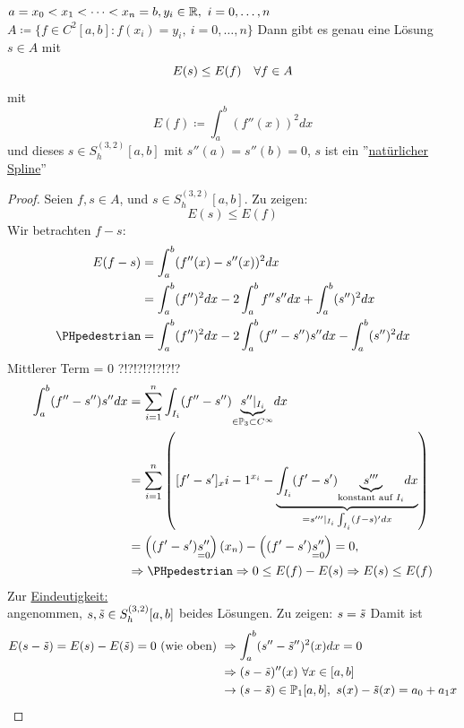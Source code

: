 \begin{theorem}
    \(a=x_0<x_1<\dots<x_n=b, y_i \in \mathbb{R} , \ i=0,\dots,n\)\\
    \(A\coloneqq \{ f\in C^2[a,b]\colon f(x_i)=y_i, \ i=0,\dots,n\}\)
    Dann gibt es genau eine Lösung $s\in A$ mit \[
        E(s) \leq E(f)\hspace{1em} \forall f\in A
    \] mit \[
        E(f) \coloneqq \int_a^b (f''(x))^2 dx
    \]
    und dieses \(s\in S^{(3,2)}_h[a,b]\) mit $s''(a)=s''(b)=0$, $s$ ist ein ''\underline{natürlicher Spline}''
    
\end{theorem}
\begin{proof}
    Seien $f,s\in A$, und $s\in S^{(3,2)}_h[a,b]$. Zu zeigen:\[
        E(s) \leq E(f)
    \]
    Wir betrachten $f-s$: \begin{align*}
        E(f-s) &= \int_a^b (f''(x) - s''(x))^2 dx\\
               &= \int_a^b (f'')^2 dx  - 2 \int_a^b f''s'' dx + \int_a^b (s'')^2 dx\\
              \text{\PHpedestrian} &= \int_a^b (f'')^2 dx - 2 \int_a^b(f'' - s'')s'' dx - \int_a^b (s'')^2 dx
    \end{align*}
    Mittlerer Term = 0 ?!?!?!?!?!?!?\begin{align*}
        \int_a^b(f'' - s'') s'' dx &= \dsum_{i=1}^n \int_{I_i}(f'' - s'')\underset{\in \Pol_3 \subset C^\infty}
        {\underbrace{s''\vert_{I_i}}} dx\\
        &= \dsum_{i=1}^n\left([f'-s']_x{i-1}^{x_i} - \underset{=s'''\vert_{I_i} \int_{I_i}(f-s)'dx}{\underbrace{\int_{I_i}
        (f'-s')\underset{\text{konstant auf $I_i$}}
        {\underbrace{s'''}} dx}}\right)\\
        &=\left((f'-s')\underset{=0}{s''}\right)(x_n)-\left((f'-s')\underset{=0}{s''}\right)=0, \\ &\Rightarrow 
        \text{\PHpedestrian} \Rightarrow 0\leq E(f)-E(s) \Rightarrow E(s)\leq E(f)
    \end{align*}
    Zur \underline{Eindeutigkeit:}\\
   \newcommand{\Ts}{\Tilde{s}}
    angenommen, $s,\Tilde{s} \in S^{(3,2)}_h[a,b]$ beides Lösungen. Zu zeigen: 
        $s=\Tilde{s}$
    Damit ist 
    \begin{align*}
        E(s-\Tilde{s})= E(s)-E(\Tilde{s})=0\text{ (wie oben) } &\Rightarrow \int_a^b(s''-\Ts'')^2(x)dx = 0 \\
        &\Rightarrow (s-\Ts)''(x)\ \forall x\in [a,b]\\
        &\rightarrow (s-\Ts)\in\Pol_1[a,b], \ s(x)-\Ts(x)=a_0+a_1x\\

\end{align*}
\end{proof}
